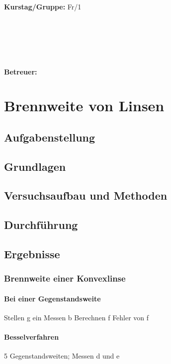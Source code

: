 \documentclass{article}
\begin{document}
\begin{verbatim}


\end{verbatim}
			\begin{flushleft}
			\textbf{\Large{Kurstag/Gruppe:}} \Large{Fr/1}
			\end{flushleft}

\begin{verbatim}






\end{verbatim}
			\begin{flushleft}
			\LARGE{\textbf{Betreuer:}}	\Large{}	
			\end{flushleft}
\newpage	

\section{Brennweite von Linsen}

\subsection{Aufgabenstellung}
\subsection{Grundlagen}
\subsection{Versuchsaufbau und Methoden}
\subsection{Durchführung}
\subsection{Ergebnisse}
\subsubsection*{Brennweite einer Konvexlinse}
\paragraph{Bei einer Gegenstandsweite}

Stellen g ein
Messen b
Berechnen f
Fehler von f
\paragraph{Besselverfahren}
5 Gegenstandsweiten; Messen d und e
\end{document}
